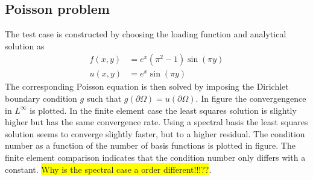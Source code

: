 \subsection{Poisson problem}
The test case is constructed by choosing the loading function and analytical solution as 
\begin{align}
	f(x,y) &=  e^{x}(\pi^2-1)\sin(\pi y)\\
	u(x,y) &=  e^{x}\sin(\pi y) %
	\label{eq:poissonTestCasevariables}
\end{align}
%
The corresponding Poisson equation is then solved by imposing the Dirichlet boundary condition $g$ such that $g(\partial \Omega) = u(\partial \Omega)$.
In figure the convergengence in $L^{\infty}$ is plotted. In the finite element case the least squares solution is slightly higher but has the same convergence rate. Using a spectral basis the least squares solution seems to converge slightly faster, but to a higher residual. The condition number as a function of the number of basis functions is plotted in figure. The finite element comparison indicates that the condition number only differs with a constant. \colorbox{yellow}{Why is the spectral case a order different!!!??}. 
%
